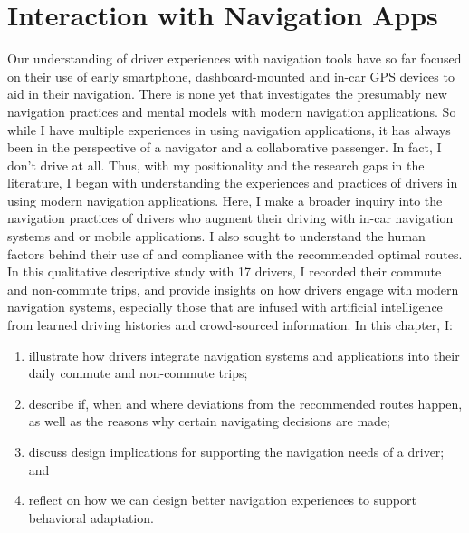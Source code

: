 
\chapter{Interaction with Navigation Apps}
\label{ChapterInteractNavi}

Our understanding of driver experiences with navigation tools have so far focused on their use of early smartphone, dashboard-mounted and in-car GPS devices to aid in their navigation\cite{Brown2012TheGPS, Dingus1997a, Mahmud2009UserDrivers}. There is none yet that investigates the presumably new navigation practices and mental models with modern navigation applications. So while I have multiple experiences in using navigation applications, it has always been in the perspective of a navigator and a collaborative passenger. In fact, I don’t drive at all. Thus, with my positionality and the research gaps in the literature, I began with understanding the experiences and practices of drivers in using modern navigation applications. Here, I make a broader inquiry into the navigation practices of drivers who augment their driving with in-car navigation systems and or mobile applications. I also sought to understand the human factors behind their use of and compliance with the recommended optimal routes. In this qualitative descriptive study with 17 drivers, I recorded their commute and non-commute trips, and provide insights on how drivers engage with modern navigation systems, especially those that are infused with artificial intelligence from learned driving histories and crowd-sourced information. In this chapter, I:

\begin{enumerate}
\item illustrate how drivers integrate navigation systems and applications into their daily commute and non-commute trips;
\item describe if, when and where deviations from the recommended routes happen, as well as the reasons why certain navigating decisions are made;
\item discuss design implications for supporting the navigation needs of a driver; and 
\item reflect on how we can design better navigation experiences to support behavioral adaptation.
\end{enumerate}


